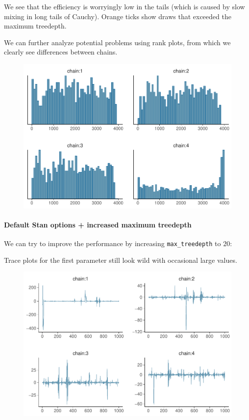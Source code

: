 \documentclass[american,]{article}
\let\oldparagraph\paragraph
\renewcommand{\paragraph}[1]{\oldparagraph{#1}\mbox{}}
\begin{document}
We see that the efficiency is worryingly low in the tails (which is
caused by slow mixing in long tails of Cauchy). Orange ticks show draws
that exceeded the maximum treedepth.

We can further analyze potential problems using rank plots, from which
we clearly see differences between chains.

\begin{figure}[tp]
  \centering
  \includegraphics[width=0.6\linewidth]{graphics/hist-fit-nom-2-1.pdf}
\end{figure}

\hypertarget{default-stan-options-increased-maximum-treedepth}{%
\paragraph{Default Stan options + increased maximum
treedepth}\label{default-stan-options-increased-maximum-treedepth}}

We can try to improve the performance by increasing
\texttt{max\_treedepth} to \(20\):

Trace plots for the first parameter still look wild with occasional
large values.

\begin{figure}[tp]
  \centering
  \includegraphics[width=0.6\linewidth]{graphics/trace-fit-nom-td20-1.pdf}
\end{figure}
\end{document}
